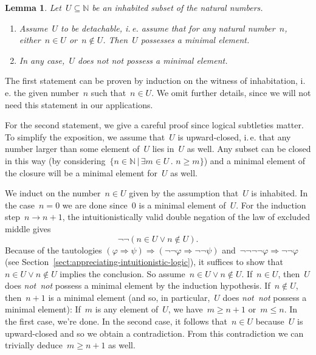 \documentclass[10pt,reqno,a4paper]{amsbook}
\makeatletter
\theoremstyle{definition}
\theoremstyle{plain}
\newtheorem{lemma}[defn]{Lemma}
\theoremstyle{remark}
\newcommand{\NN}{\mathbb{N}}
\newcommand{\?}{\,{:}\,}
\renewcommand{\_}{\mathpunct{.}\,}
\newcommand{\ie}{i.\,e.\@\xspace}
\newcommand{\notnot}{\emph{not~not}\xspace}
\renewenvironment{proof}[1][\proofname]{\par
  \pushQED{\qed}%
  \normalfont \topsep6\p@\@plus6\p@\relax
  \trivlist
  \item[\hskip\labelsep
        \itshape
    #1\@addpunct{.}]\ignorespaces
}{%
  \popQED\endtrivlist\@endpefalse
}
\makeatother
\begin{document}
\begin{lemma}\label{lemma:minimum-subset-naturals}
Let~$U \subseteq \NN$ be an inhabited subset of the natural
numbers.
\begin{enumerate}
\item Assume~$U$ to be \emph{detachable}, \ie assume that for any natural
number~$n$, either~$n \in U$ or~$n \not\in U$. Then~$U$ possesses a minimal
element.
\item In any case,~$U$ does \emph{not not} possess a minimal element.
\end{enumerate}
\end{lemma}
\begin{proof}
The first statement can be proven by induction on the witness of inhabitation,
\ie the given number~$n$ such that~$n \in U$. We omit further details, since we will
not need this statement in our applications.

For the second statement, we give a careful proof since logical subtleties matter. To simplify the
exposition, we assume that~$U$ is upward-closed, \ie that any number
larger than some element of~$U$ lies in~$U$ as well. Any subset can be closed
in this way (by considering~$\{ n \in \NN \,|\, \exists m \in U\_ n \geq m \}$)
and a minimal element of the closure will be a minimal element for~$U$ as well.

We induct on the number~$n \in U$ given by the assumption that~$U$ is
inhabited. In the case~$n = 0$ we are done since~$0$ is a minimal element
of~$U$. For the induction step~$n \to n+1$, the intuitionistically valid double
negation of the law of excluded middle
gives
\[ \neg\neg(n \in U \vee n \not\in U). \]
Because of the tautologies $(\varphi \Rightarrow \psi) \Rightarrow
(\neg\neg\varphi \Rightarrow \neg\neg\psi)$ and~$\neg\neg\neg\neg\varphi \Rightarrow
\neg\neg\varphi$ (see Section~\ref{sect:appreciating-intuitionistic-logic}), it
suffices to show that~$n \in U \vee n \not\in U$ implies the conclusion.
So assume~$n \in U \vee n \not\in U$.
If~$n \in U$, then~$U$ does \notnot possess a minimal element by the induction
hypothesis. If~$n \not\in U$, then~$n+1$ is a minimal element (and so, in
particular,~$U$ does \notnot possess a minimal element): If~$m$ is
any element of~$U$, we have~$m \geq n+1$ or~$m \leq n$. In the first case,
we're done. In the second case, it follows that~$n \in U$ because~$U$ is
upward-closed and so we obtain a contradiction. From this contradiction we
can trivially deduce~$m \geq n+1$ as well. \qedhere
\end{proof}
\end{document}
